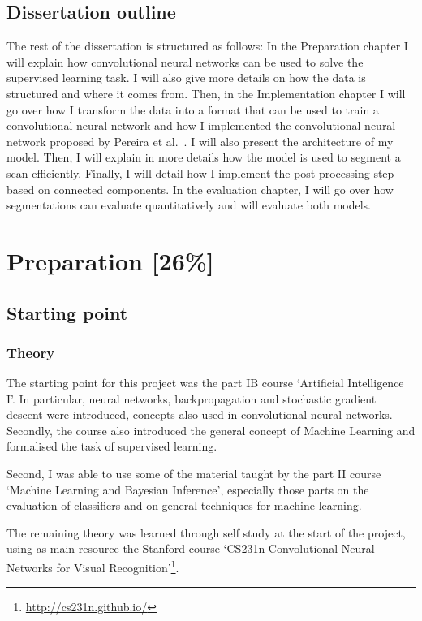\documentclass[12pt,a4paper,twoside,openright]{report}
\begin{document}
\section{Dissertation outline}
The rest of the dissertation is structured as follows: In the Preparation chapter I will explain how convolutional neural networks can be used to solve the supervised learning task. I will also give more details on how the data is structured and where it comes from. Then, in the Implementation chapter I will go over how I transform the data into a format that can be used to train a convolutional neural network and how I implemented the convolutional neural network proposed by Pereira et al.\ \cite{pereira}. I will also present the architecture of my model. Then, I will explain in more details how the model is used to segment a scan efficiently. Finally, I will detail how I implement the post-processing step based on connected components. In the evaluation chapter, I will go over how segmentations can evaluate quantitatively and will evaluate both models.

\chapter{Preparation [26\%]}

\section{Starting point}
\subsection{Theory}
The starting point for this project was the part IB course `Artificial Intelligence I'. In particular, neural networks, backpropagation and stochastic gradient descent were introduced, concepts also used in convolutional neural networks. Secondly, the course also introduced the general concept of Machine Learning and formalised the task of supervised learning.

Second, I was able to use some of the material taught by the part II course `Machine Learning and Bayesian Inference', especially those parts on the evaluation of classifiers and on general techniques for machine learning.

The remaining theory was learned through self study at the start of the project, using as main resource the Stanford course `CS231n Convolutional Neural Networks for Visual Recognition'\footnote{\url{http://cs231n.github.io/}}.
\end{document}
